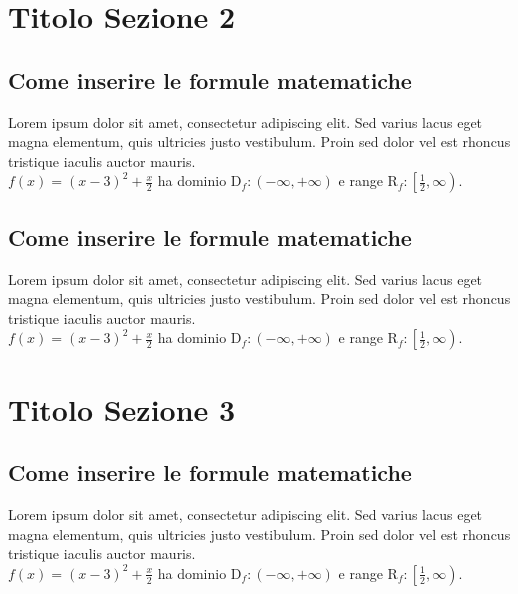 \documentclass[11pt]{article}
\begin{document}

\section{Titolo Sezione 2}

\subsection{Come inserire le formule matematiche}
Lorem ipsum dolor sit amet, consectetur adipiscing elit. Sed varius lacus eget magna elementum, quis ultricies justo vestibulum. Proin sed dolor vel est rhoncus tristique iaculis auctor mauris.\\[3mm]
$f(x)=(x-3)^2+ \displaystyle \frac{x}{2}$ ha dominio $\mathrm{D}_f:(-\infty,+\infty)$
e range $\mathrm{R}_f:\left[\frac{1}{2},\infty\right)$.\\

\subsection{Come inserire le formule matematiche}
Lorem ipsum dolor sit amet, consectetur adipiscing elit. Sed varius lacus eget magna elementum, quis ultricies justo vestibulum. Proin sed dolor vel est rhoncus tristique iaculis auctor mauris.\\[3mm]
$f(x)=(x-3)^2+ \displaystyle \frac{x}{2}$ ha dominio $\mathrm{D}_f:(-\infty,+\infty)$
e range $\mathrm{R}_f:\left[\frac{1}{2},\infty\right)$.\\

\newpage
\section{Titolo Sezione 3}

\subsection{Come inserire le formule matematiche}
Lorem ipsum dolor sit amet, consectetur adipiscing elit. Sed varius lacus eget magna elementum, quis ultricies justo vestibulum. Proin sed dolor vel est rhoncus tristique iaculis auctor mauris.\\[3mm]
$f(x)=(x-3)^2+ \displaystyle \frac{x}{2}$ ha dominio $\mathrm{D}_f:(-\infty,+\infty)$
e range $\mathrm{R}_f:\left[\frac{1}{2},\infty\right)$.\\
\end{document}

